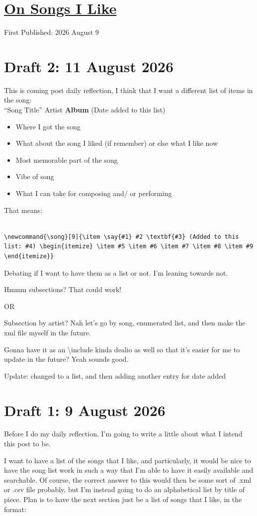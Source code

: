 \documentclass[12pt]{article}
\newcommand{\say}[1]{``#1''}
\renewcommand{\,}{\textsuperscript{,}}
\renewcommand{\title}[2]{\section{\href{#1.html}{#2}}}
\newcommand{\published}[1]{First Published: #1}
\newcommand{\draft}[1]{\section{Draft #1}}
\newcommand{\song}[9]{\item \say{#1} #2 \textbf{#3} (Added to this list: #4) \begin{itemize} \item #5 \item #6 \item #7 \item #8 \item #9 \end{itemize}}
\begin{document}
  
\title{songs-i-like}{On Songs I Like}  
\published{2026 August 9}

\draft{2: 11 August 2026}

This is coming post daily reflection, I think that I want a different list of items in the song:\\  
\say{Song Title} Artist \textbf{Album} (Date added to this list)
\begin{itemize}  
\item Where I got the song  
\item What about the song I liked (if remember) or else what I like now  
\item Most memorable part of the song  
\item Vibe of song  
\item What I can take for composing  and/ or performing
\end{itemize}

That means:

\begin{verbatim}

\newcommand{\song}[9]{\item \say{#1} #2 \textbf{#3} (Added to this list: #4) \begin{itemize} \item #5 \item #6 \item #7 \item #8 \item #9 \end{itemize}}

\end{verbatim}

Debating if I want to have them as a list or not. I'm leaning towards not.

Hmmm subsections? That could work!

OR

Subsection by artist? Nah let's go by song, enumerated list, and then make the xml file myself in the future.

Gonna have it as an \backslash{}include kinda dealio as well so that it's easier for me to update in the future? Yeah sounds good.

Update: changed to a list, and then adding another entry for date added

\draft{1: 9 August 2026}

Before I do my daily reflection, I'm going to write a little about what I intend this post to be.

I want to have a list of the songs that I like, and particularly, it would be nice to have the song list work in such a way that I'm able to have it easily available and searchable.  
Of course, the correct answer to this would then be some sort of .xml or .csv file probably, but I'm instead going to do an alphabetical list by title of piece.  
Plan is to have the next section just be a list of songs that I like, in the format:
\end{document}
